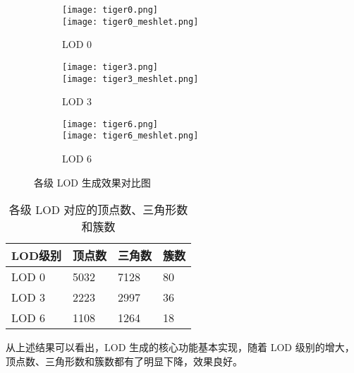 \begin{figure*}[h]
    \centering
    \begin{subfigure}[t]{0.32\linewidth}
        \centering
        \texttt{[image: tiger0.png]}\\
        \vspace{0.1cm}
        \texttt{[image: tiger0\_meshlet.png]}
        \caption{LOD 0}
    \end{subfigure}%
    \hfill
    \begin{subfigure}[t]{0.32\linewidth}
        \centering
        \texttt{[image: tiger3.png]}\\
        \vspace{0.1cm}
        \texttt{[image: tiger3\_meshlet.png]}
        \caption{LOD 3}
    \end{subfigure}%
    \hfill
    \begin{subfigure}[t]{0.32\linewidth}
        \centering
        \texttt{[image: tiger6.png]}\\
        \vspace{0.1cm}
        \texttt{[image: tiger6\_meshlet.png]}
        \caption{LOD 6}
    \end{subfigure}
    \caption{各级 LOD 生成效果对比图}
    \label{fig:LOD generation}
\end{figure*}

\begin{table}[H]
    \caption{\label{tab:LOD}各级 LOD 对应的顶点数、三角形数和簇数}
    \begin{tabularx}{\linewidth}{|X<{\centering}|X<{\centering}|X<{\centering}|X<{\centering}|}
        \hline
        LOD级别 & 顶点数 & 三角数 & 簇数 \\ \hline
        LOD 0 & 5032 & 7128 & 80 \\ \hline
        LOD 3 & 2223 & 2997 & 36 \\ \hline
        LOD 6 & 1108 & 1264 & 18 \\ \hline
    \end{tabularx}
\end{table}

从上述结果可以看出，LOD 生成的核心功能基本实现，随着 LOD 级别的增大，顶点数、三角形数和簇数都有了明显下降，效果良好。

